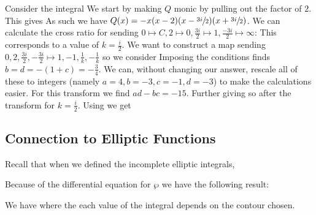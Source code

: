 \documentclass{article}
\begin{document}
\begin{example}
	Consider the integral 
We start by making $Q$ monic by pulling out the factor of $2$. This gives 
As such we have $Q(x) = -x(x-2)(x-\sfrac{3i}{2})(x+\sfrac{3i}{2})$. We can  calculate the cross ratio for sending $0 \mapsto C, 2 \mapsto 0, \frac{3i}{2} \mapsto 1, \frac{-3i}{2}\mapsto \infty$:
This corresponds to a value of $k=\frac{i}{2}$. We want to construct a map sending $0,2,\frac{3i}{2},-\frac{3i}{2} \mapsto 1,-1,\frac{1}{k}, -\frac{1}{k}$ so we consider 
Imposing the conditions finds $b=d=-(1+c) = -\frac{3}{4}$. We can, without changing our answer, rescale all of these to integers (namely $a=4, b=-3, c=-1, d=-3$) to make the calculations easier. For this transform we find $ad-bc=-15$. Further
giving 
so after the transform 
for $k=\frac{i}{2}$. Using 
we get 
\end{example}

\subsection{Connection to Elliptic Functions}

Recall that when we defined the incomplete elliptic integrals,

Because of the differential equation for $\wp$ we have the following result:

\begin{prop}
We have 
where the each value of the integral depends on the contour chosen. 
\end{prop}
\end{document}
